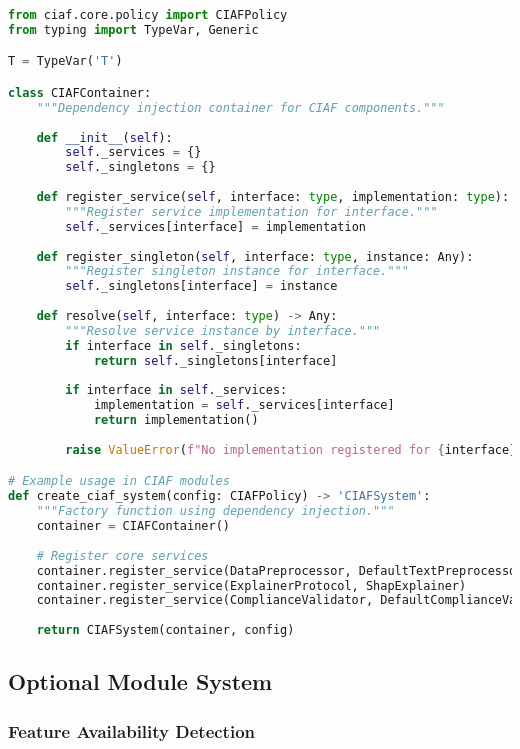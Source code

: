\documentclass[12pt,a4paper]{article}
\begin{document}
\begin{lstlisting}[language=Python, caption=Dependency Injection Implementation]
from ciaf.core.policy import CIAFPolicy
from typing import TypeVar, Generic

T = TypeVar('T')

class CIAFContainer:
    """Dependency injection container for CIAF components."""
    
    def __init__(self):
        self._services = {}
        self._singletons = {}
    
    def register_service(self, interface: type, implementation: type):
        """Register service implementation for interface."""
        self._services[interface] = implementation
    
    def register_singleton(self, interface: type, instance: Any):
        """Register singleton instance for interface."""
        self._singletons[interface] = instance
    
    def resolve(self, interface: type) -> Any:
        """Resolve service instance by interface."""
        if interface in self._singletons:
            return self._singletons[interface]
        
        if interface in self._services:
            implementation = self._services[interface]
            return implementation()
        
        raise ValueError(f"No implementation registered for {interface}")

# Example usage in CIAF modules
def create_ciaf_system(config: CIAFPolicy) -> 'CIAFSystem':
    """Factory function using dependency injection."""
    container = CIAFContainer()
    
    # Register core services
    container.register_service(DataPreprocessor, DefaultTextPreprocessor)
    container.register_service(ExplainerProtocol, ShapExplainer)
    container.register_service(ComplianceValidator, DefaultComplianceValidator)
    
    return CIAFSystem(container, config)
\end{lstlisting}

\subsection{Optional Module System}

\subsubsection{Feature Availability Detection}
\end{document}
